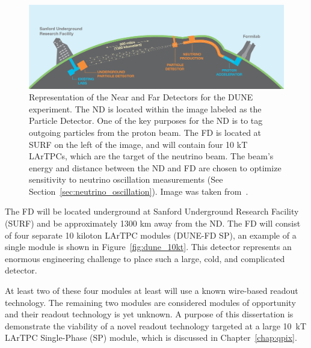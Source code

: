 \begin{figure}[]
\centering
\includegraphics[width=\textwidth]{images/LBNE_Graphic_061615_2016.jpg}
\caption{Representation of the Near and Far Detectors for the DUNE experiment.
The ND is located within the image labeled as the Particle Detector.
One of the key purposes for the ND is to tag outgoing particles from the proton beam.
The FD is located at SURF on the left of the image, and will contain four 10 kT LArTPCs, which are the target of the neutrino beam.
The beam's energy and distance between the ND and FD are chosen to optimize sensitivity to neutrino oscillation measurements (See Section~\ref{sec:neutrino_oscillation}).
Image was taken from~\citep{dune_cdr_2016_arxiv}.}
\label{fig:dune_fd_image}
\end{figure}


The FD will be located underground at Sanford Underground Research Facility (SURF) and be approximately 1300 km away from the ND.
The FD will consist of four separate 10 kiloton LArTPC modules (DUNE-FD SP), an example of a single module is shown in Figure~\ref{fig:dune_10kt}.
This detector represents an enormous engineering challenge to place such a large, cold, and complicated detector.

At least two of these four modules at least will use a known wire-based readout technology.
The remaining two modules are considered modules of opportunity and their readout technology is yet unknown.
A purpose of this dissertation is demonstrate the viability of a novel readout technology targeted at a large 10~\unit{kT} LArTPC Single-Phase (SP) module, which is discussed in Chapter~\ref{chap:qpix}.

